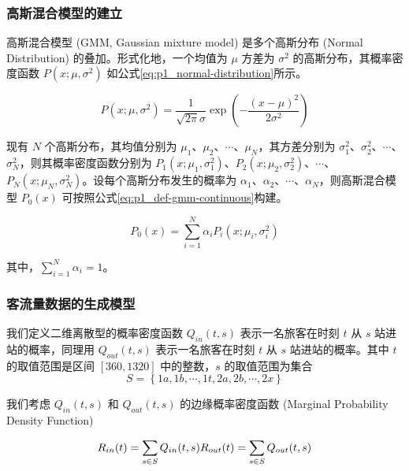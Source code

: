 \documentclass[12pt,a4paper]{mcmthesis}
\begin{document}
    \subsubsection{高斯混合模型的建立}

    高斯混合模型 (GMM, Gaussian mixture model) 是多个高斯分布 (Normal Distribution) 的叠加。形式化地，一个均值为 $\mu$ 方差为 $\sigma^2$ 的高斯分布，其概率密度函数 $P(x;\mu,\sigma^2)$ 如公式\ref{eq:p1_normal-distribution}所示。

    \begin{equation}
        P(x;\mu,\sigma^2) = \frac{1}{\sqrt{2\pi}\sigma} \exp \left( - \frac{(x-\mu)^2}{2\sigma^2} \right)
        \label{eq:p1_normal-distribution}
    \end{equation}

    现有 $N$ 个高斯分布，其均值分别为 $\mu_1$、$\mu_2$、$\cdots$、$\mu_N$，其方差分别为 $\sigma^2_1$、$\sigma^2_2$、$\cdots$、$\sigma^2_N$，则其概率密度函数分别为 $P_1(x;\mu_1,\sigma^2_1)$、$P_2(x;\mu_2,\sigma^2_2)$、$\cdots$、$P_N(x;\mu_N,\sigma^2_N)$。设每个高斯分布发生的概率为 $\alpha_1$、$\alpha_2$、$\cdots$、$\alpha_N$，则高斯混合模型 $P_0(x)$ 可按照公式\ref{eq:p1_def-gmm-continuous}构建。

    \begin{equation}
        P_0(x) = \sum_{i=1}^{N} \alpha_i P_i(x;\mu_i,\sigma^2_i)
        \label{eq:p1_def-gmm-continuous}
    \end{equation}

    其中，$\sum_{i=1}^{N} \alpha_i=1$。

    \subsubsection{客流量数据的生成模型}

    我们定义二维离散型的概率密度函数 $Q_{in}(t,s)$ 表示一名旅客在时刻 $t$ 从 $s$ 站进站的概率，同理用 $Q_{out}(t,s)$ 表示一名旅客在时刻 $t$ 从 $s$ 站进站的概率。其中 $t$ 的取值范围是区间 $[360,1320]$ 中的整数，$s$ 的取值范围为集合
    \[ S = \left\{ 1a,1b,\cdots,1t,2a,2b,\cdots,2x \right\} \]

    我们考虑 $Q_{in}(t,s)$ 和 $Q_{out}(t,s)$ 的边缘概率密度函数 (Marginal Probability Density Function)

    \begin{equation*}
        R_{in}(t) = \sum_{s \in S} Q_{in}(t,s) \\
        R_{out}(t) = \sum_{s \in S} Q_{out}(t,s)
    \end{equation*}
\end{document}
